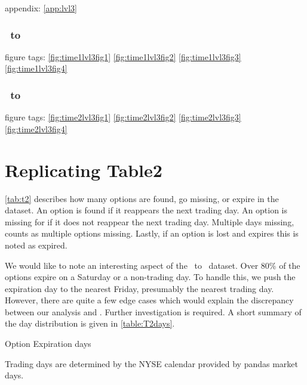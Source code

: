 appendix: \autoref{app:lvl3}


\subsubsection{\STARTONE\ to \ENDONE }
figure tags: 
\autoref{fig:time1lvl3fig1}
\autoref{fig:time1lvl3fig2}
\autoref{fig:time1lvl3fig3}
\autoref{fig:time1lvl3fig4}
\subsubsection{\STARTTWO\ to \ENDTWO }
figure tags: 
\autoref{fig:time2lvl3fig1}
\autoref{fig:time2lvl3fig2}
\autoref{fig:time2lvl3fig3}
\autoref{fig:time2lvl3fig4}











\section{Replicating Table2}
\autoref{tab:t2} describes how many options are found, go missing, or expire in the dataset. An option is found if it reappears the next trading day. An option is missing for if it does not reappear the next trading day. Multiple days missing, counts as multiple options missing. Lastly, if an option is lost and expires this is noted as expired. 

We would like to note an interesting aspect of the \STARTONE\ to \ENDONE\ dataset. Over 80\% of the options expire on a Saturday or a non-trading day. To handle this, we push the expiration day to the nearest Friday, presumably the nearest trading day. However, there are quite a few edge cases which would explain the discrepancy between our analysis and \citet{constantinides2013}. Further investigation is required. A short summary of the day distribution is given in \autoref{table:T2days}. 



\begin{table}[ht]

\centering
{}
\caption{Option Expiration days}



\caption*{Trading days are determined by the NYSE calendar provided by pandas market days. }
\label{table:T2days}
\end{table}






